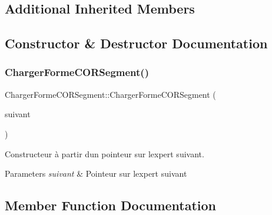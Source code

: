 \subsection*{Additional Inherited Members}


\subsection{Constructor \& Destructor Documentation}
\mbox{\label{class_charger_forme_c_o_r_segment_ac3a9caaf7fc8e03678cca2161513a1f4}} 
\subsubsection{\texorpdfstring{Charger\+Forme\+C\+O\+R\+Segment()}{ChargerFormeCORSegment()}}
{\footnotesize\ttfamily Charger\+Forme\+C\+O\+R\+Segment\+::\+Charger\+Forme\+C\+O\+R\+Segment (\begin{DoxyParamCaption}\item[{\hyperlink{class_charger_forme_c_o_r}{Charger\+Forme\+C\+OR} $\ast$}]{suivant }\end{DoxyParamCaption})}



Constructeur à partir d\textquotesingle{}un pointeur sur l\textquotesingle{}expert suivant. 


\begin{DoxyParams}{Parameters}
{\em suivant} & Pointeur sur l\textquotesingle{}expert suivant \\
\hline
\end{DoxyParams}


\subsection{Member Function Documentation}
\mbox{\label{class_charger_forme_c_o_r_segment_a88fc3dc3d1e4fb196246f5105965e285}} 
